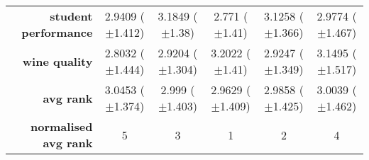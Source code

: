 \begin{table}[htb]
{\begin{tabular}{r|ccccc}
			\textbf{student performance} & \cellcolor[rgb]{ .89,  .89,  .51}2.9409 ($\pm$1.412)    & \cellcolor[rgb]{ .973,  .412,  .42}3.1849 ($\pm$1.38)   & \cellcolor[rgb]{ .388,  .745,  .482}2.771 ($\pm$1.41)   & \cellcolor[rgb]{ .98,  .561,  .451}3.1258 ($\pm$1.366)  & \cellcolor[rgb]{ 1,  .922,  .518}2.9774 ($\pm$1.467)    \\
			\textbf{wine quality}        & \cellcolor[rgb]{ .388,  .745,  .482}2.8032 ($\pm$1.444) & \cellcolor[rgb]{ .976,  .914,  .514}2.9204 ($\pm$1.304) & \cellcolor[rgb]{ .973,  .412,  .42}3.2022 ($\pm$1.41)   & \cellcolor[rgb]{ 1,  .922,  .518}2.9247 ($\pm$1.349)    & \cellcolor[rgb]{ .98,  .51,  .439}3.1495 ($\pm$1.517)   \\
			\midrule
			\textbf{avg rank}            & \cellcolor[rgb]{ .973,  .412,  .42}3.0453 ($\pm$1.374)  & \cellcolor[rgb]{ 1,  .922,  .518}2.999 ($\pm$1.403)     & \cellcolor[rgb]{ .388,  .745,  .482}2.9629 ($\pm$1.409) & \cellcolor[rgb]{ .773,  .855,  .502}2.9858 ($\pm$1.425) & \cellcolor[rgb]{ 1,  .871,  .51}3.0039 ($\pm$1.462)     \\
			\midrule
			\textbf{normalised avg rank} & \cellcolor[rgb]{ .973,  .412,  .42}5                    & \cellcolor[rgb]{ 1,  .922,  .518}3                      & \cellcolor[rgb]{ .388,  .745,  .482}1                   & \cellcolor[rgb]{ .694,  .831,  .498}2                   & \cellcolor[rgb]{ .988,  .667,  .471}4                   \\
		\end{tabular}%

	}

\end{table}%


